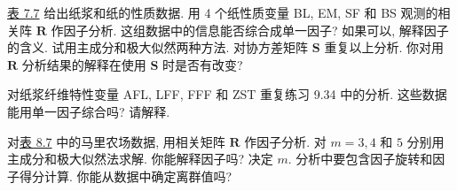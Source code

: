 
\quad \hyperref[tab:7.7]{表 7.7} 给出纸浆和纸的性质数据. 用 4 个纸性质变量 BL, EM, SF 和 BS 观测的相关阵 $\mathbf{R}$ 作因子分析. 这组数据中的信息能否综合成单一因子? 如果可以, 解释因子的含义. 试用主成分和极大似然两种方法. 对协方差矩阵 $\mathbf{S}$ 重复以上分析. 你对用 $\mathbf{R}$ 分析结果的解释在使用 $\mathbf{S}$ 时是否有改变?

\quad 对纸浆纤维特性变量 AFL, LFF, FFF 和 ZST 重复练习 9.34 中的分析. 这些数据能用单一因子综合吗? 请解释.

\quad 对\hyperref[tab:8.7]{表 8.7} 中的马里农场数据, 用相关矩阵 $\mathbf{R}$ 作因子分析. 对 $m=3,4$ 和 $5$ 分别用主成分和极大似然法求解. 你能解释因子吗? 决定 $m$. 分析中要包含因子旋转和因子得分计算. 你能从数据中确定离群值吗?

\par{}\vspace{4pt}

